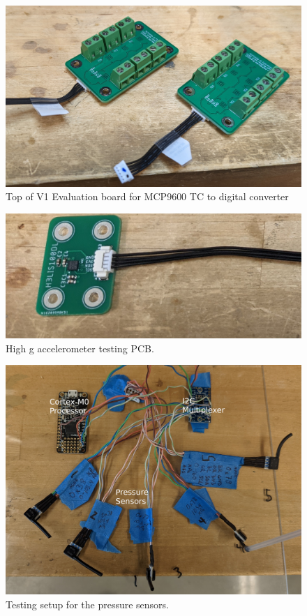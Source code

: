 \documentclass{article}
\begin{document}
\begin{figure}[h!]
	\centering
	\includegraphics[width=\textwidth]{images/tc-board-top}
	\caption{Top of V1 Evaluation board for MCP9600 TC to digital converter}
	\label{fig:tc-board-top}
\end{figure}

\begin{figure}[h!]
	\centering
	\includegraphics[width=\textwidth]{images/100g-accel-board}
	\caption{High g accelerometer testing PCB.}
	\label{fig:accel-board}
\end{figure}

\begin{figure}[h!]
	\centering
	\includegraphics[width=\textwidth]{images/pressure-sensor-testbed-annotated}
	\caption{Testing setup for the pressure sensors.}
	\label{fig:pressure-testbed}
\end{figure}
\end{document}
